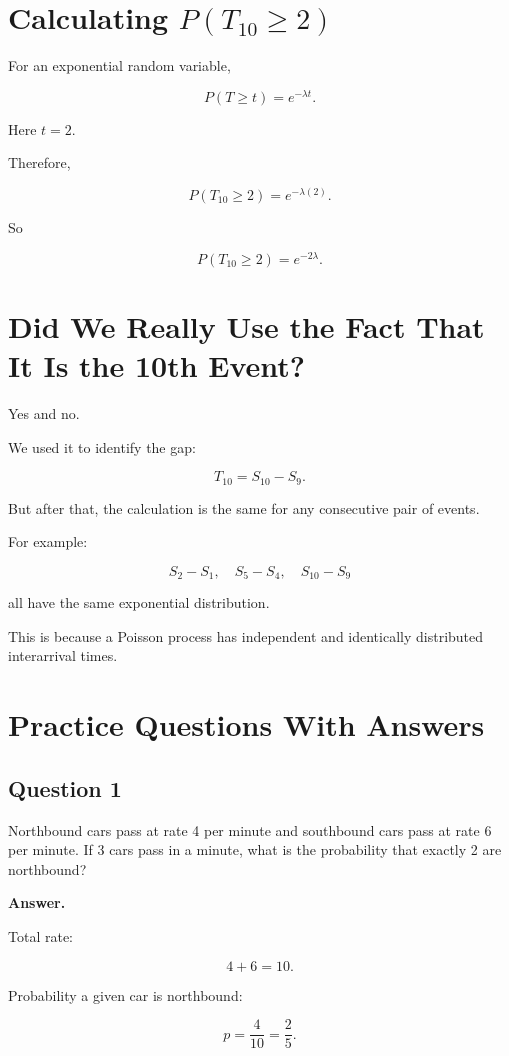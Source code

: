 \documentclass[12pt]{article}
\begin{document}
\section{Calculating \(P(T_{10}\geq 2)\)}

For an exponential random variable,

\[
P(T\geq t)=e^{-\lambda t}.
\]

Here \(t=2\).

Therefore,

\[
P(T_{10}\geq 2)=e^{-\lambda(2)}.
\]

So

\[
\boxed{P(T_{10}\geq 2)=e^{-2\lambda}.}
\]

\section{Did We Really Use the Fact That It Is the 10th Event?}

Yes and no.

We used it to identify the gap:

\[
T_{10}=S_{10}-S_9.
\]

But after that, the calculation is the same for any consecutive pair of events.

For example:

\[
S_2-S_1,\quad S_5-S_4,\quad S_{10}-S_9
\]

all have the same exponential distribution.

This is because a Poisson process has independent and identically distributed interarrival times.

\section{Practice Questions With Answers}

\subsection*{Question 1}

Northbound cars pass at rate 4 per minute and southbound cars pass at rate 6 per minute. If 3 cars pass in a minute, what is the probability that exactly 2 are northbound?

\textbf{Answer.}

Total rate:

\[
4+6=10.
\]

Probability a given car is northbound:

\[
p=\frac{4}{10}=\frac{2}{5}.
\]
\end{document}
